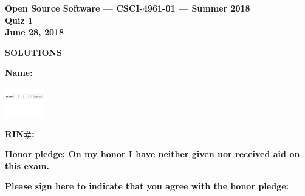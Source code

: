 \documentclass[10pt]{article}
\begin{document}
\thispagestyle{empty}

\vspace*{0.5in}

\begin{center}
\Large
\textbf{Open Source Software --- CSCI-4961-01 --- Summer 2018} \\
\textbf{Quiz 1} \\
\textbf{June 28, 2018}
\end{center}


\beginanswers
\begin{center}
\Large
\textbf{SOLUTIONS}
\end{center}

\else


\begin{center}

\textbf{\Large Name:} \underline {\hspace{2.0in}} \\

\bigskip
\bigskip

\centerline{
\includegraphics[height=0.5in]{boxes}
}


\bigskip

\textbf{\Large RIN\#:} \underline {\hspace{1.5in}}  

\vspace*{0.4in}
{\large\bf Honor pledge: On my honor I have neither given
nor received aid on this exam.}

\vspace*{0.1in}
{\large\bf Please sign here to indicate that you agree with the honor pledge: \underline {\hspace{1.5in}}}
\end{center}
\end{document}
